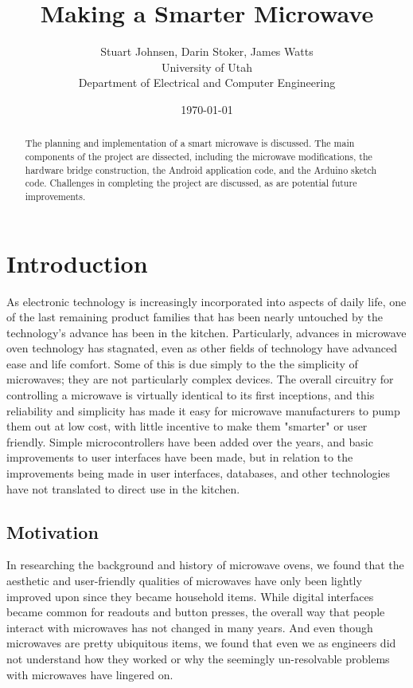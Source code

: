 \documentclass[10pt,journal,letterpaper,twocolumn]{IEEEtran}
\title{Making a Smarter Microwave}
\author{Stuart Johnsen, Darin Stoker, James Watts\\University of Utah\\ Department of Electrical and Computer Engineering}
\date{\today}
\begin{document}
\maketitle

\begin{abstract}
The planning and implementation of a smart microwave is discussed. The main components of the project are dissected, including the microwave modifications, the hardware bridge construction, the Android application code, and the Arduino sketch code.  Challenges in completing the project are discussed, as are potential future improvements.
\end{abstract}

\section{Introduction}
As  electronic technology is increasingly incorporated into aspects of daily life, one of the last remaining product families that has been nearly untouched by the technology's advance has been in the kitchen.  Particularly,  advances in microwave oven technology has stagnated, even as other fields of technology have advanced ease and life comfort.   Some of this is due simply to the the simplicity of microwaves; they are not particularly complex devices.  The overall circuitry for controlling a microwave is virtually identical to its first inceptions, and this reliability and simplicity has made it easy for microwave manufacturers to pump them out at low cost, with little incentive to make them "smarter" or user friendly.  Simple microcontrollers have been added over the years, and basic improvements to user interfaces have been made, but in relation to the improvements being made in user interfaces, databases, and other technologies have not translated to direct use in the kitchen.

\subsection{Motivation}
In researching the background and history of microwave ovens, we found that the aesthetic and user-friendly qualities of microwaves have only been lightly improved upon since they became household items.  While digital interfaces became common for readouts and button presses, the overall way that people interact with microwaves has not changed in many years.  And even though microwaves are pretty ubiquitous items, we found that even we as engineers did not understand how they worked or why the seemingly un-resolvable problems with microwaves have lingered on.
\end{document}
